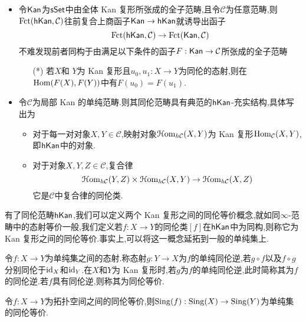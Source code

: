 \begin{remark}
    \begin{itemize}
        \item 令$\mathsf{Kan}$为$\mathsf{sSet}$中由全体 Kan 复形所张成的全子范畴,且令$\mathcal{C}$为任意范畴,则$\operatorname{Fct}(\mathsf{hKan},\mathcal{C})$往前复合上商函子$\mathsf{Kan} \to \mathsf{hKan}$就诱导出函子
        \[
            \operatorname{Fct}(\mathsf{hKan},\mathcal{C})\to \operatorname{Fct}(\mathsf{Kan},\mathcal{C})
        \]
        不难发现前者同构于由满足以下条件的函子$F: \mathsf{Kan} \to \mathcal{C}$所张成的全子范畴
        \begin{enumerate}
            \item[(*)] 若$X$和 $Y$为 Kan 复形且$u_0,u_1: X \to Y$为同伦的态射,则在$\operatorname{Hom}(F(X),F(Y))$中有$F(u_0) = F(u_1)$.
        \end{enumerate}
        \item 令$\mathcal{C}$为局部 Kan 的单纯范畴.则其同伦范畴具有典范的$\mathsf{hKan}$-充实结构,具体写出为
        \begin{itemize}
            \item 对于每一对对象$X,Y \in \mathcal{C}$,映射对象$\EuScript{H}\mathrm{om}_{h\mathcal{C}}(X,Y)$为 Kan 复形$\operatorname{Hom}_{\mathcal{C}}(X,Y)$,即$\mathsf{hKan}$中的对象.
            \item 对于对象$X,Y,Z\in \mathcal{C}$,复合律
            \[
                \EuScript{H}\mathrm{om}_{h\mathcal{C}} (Y,Z) \times \EuScript{H}\mathrm{om}_{h\mathcal{C}}(X,Y) \to \EuScript{H}\mathrm{om}_{h\mathcal{C}}(X,Z)
            \]
            它是$\mathcal{C}$中复合律的同伦类.
        \end{itemize}
    \end{itemize}
\end{remark}
有了同伦范畴$\mathsf{hKan}$,我们可以定义两个 Kan 复形之间的同伦等价概念,就如同$\infty$-范畴中的态射等价一般,我们定义若$f: X \to Y$的同伦类$[f]$在$\mathsf{hKan}$中为同构,则称它为 Kan 复形之间的同伦等价.事实上,可以将这一概念延拓到一般的单纯集上.
\begin{definition}[同伦等价]
    令$f: X \to Y$为单纯集之间的态射.称态射$g : Y \to X$为$f$的单纯同伦逆,若$g\circ f$以及$f\circ g$分别同伦于$\mathrm{id}_X$和$\mathrm{id}_Y$.在$X$和$Y$为 Kan 复形时,若$g$为$f$的单纯同伦逆,此时简称其为$f$的同伦逆.若$f$具有同伦逆,则称其为同伦等价.
\end{definition}
\begin{example}
    令$f:X \to Y$为拓扑空间之间的同伦等价,则$\operatorname{Sing}(f) : \operatorname{Sing}(X) \to \operatorname{Sing}(Y)$为单纯集的同伦等价.
\end{example}
